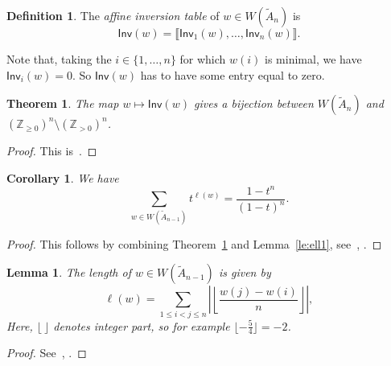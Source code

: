 \documentclass[12pt]{amsart}
\renewcommand{\ge}{\geqslant}
\renewcommand{\le}{\leqslant}
\newcommand{\llb}{\llbracket}
\newcommand{\rrb}{\rrbracket}
\newcommand{\Inv}{\mathsf{Inv}}
\newcommand{\bZ}{{\mathbb{Z}}}
\numberwithin{equation}{section}
\newtheorem{theorem}[equation]{Theorem}
\newtheorem{lemma}[equation]{Lemma}
\newtheorem{corollary}[equation]{Corollary}
\theoremstyle{definition}
\newtheorem{definition}[equation]{Definition}
\begin{document}
\begin{definition}
The \emph{affine inversion table} of $w\in W(\tilde A_n)$ is 
\[ \Inv(w) = \llb\Inv_1(w),\dots,\Inv_n(w)\rrb. \]
\end{definition}

Note that, taking the $i\in\{1,\dots,n\}$ for which $w(i)$ is
minimal, we have $\Inv_i(w)=0$. So $\Inv(w)$ has to have some 
entry equal to zero.

\begin{theorem}\label{th:bijection}
The map $w\mapsto \Inv(w)$ gives a bijection between $W(\tilde A_n)$
and $(\bZ_{\ge 0})^n\setminus(\bZ_{>0})^n$.
\end{theorem}
\begin{proof}
This is~\cite[Theorem~4.6]{Bjorner/Brenti:1996a}.
\end{proof}

\begin{corollary}\label{co:Poincareseries}
We have 
\[ \sum_{w\in W(\tilde A_{n-1})}t^{\ell(w)}=\frac{1-t^n}{(1-t)^n}. \]
\end{corollary}
\begin{proof}
This follows by combining Theorem~\ref{th:bijection} and Lemma~\ref{le:ell1},
see~\cite[Corollary~4.7]{Bjorner/Brenti:1996a},
\cite[Corollary~4.3]{Ehrenborg/Readdy:1996a}.
\end{proof}

\begin{lemma}\label{le:ell3}
The length of $w\in W(\tilde A_{n-1})$ is given by
\begin{equation*}
\ell(w) = \sum_{1\le i<j\le
    n}\left|\left\lfloor\frac{w(j)-w(i)}{n}\right\rfloor\right|, 
\end{equation*}
Here, 
$\lfloor\ \rfloor$ denotes integer part, so for example 
$\lfloor-\frac{5}{4}\rfloor=-2$.
\end{lemma}
\begin{proof}
See~\cite[Lemma~4.2.2]{Shi:1986a},
\cite[Proposition~3.1]{Bjorner/Brenti:1996a}. 
\end{proof}
\end{document}
